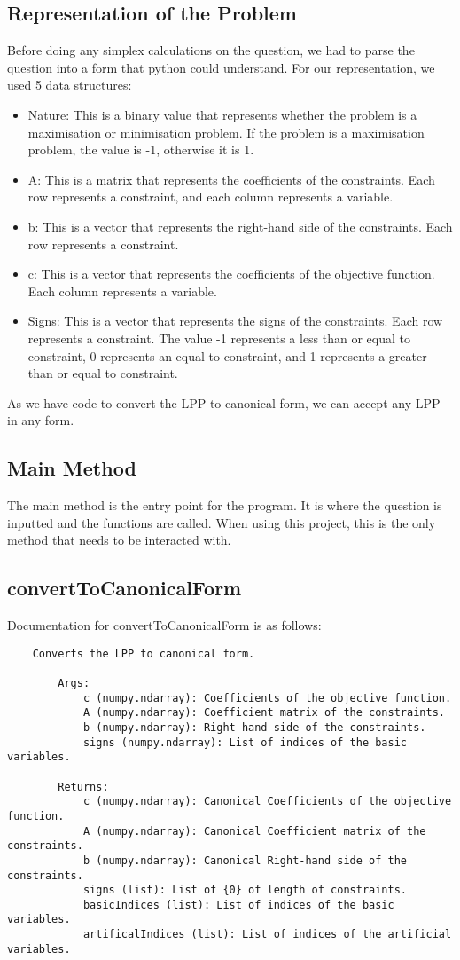 \documentclass{article}
\numberwithin{equation}{section}
\begin{document}
\subsection{Representation of the Problem}
Before doing any simplex calculations on the question, we had to parse the question into a form that python could understand. For our representation, we used 5 data structures:
\begin{itemize}
    \item Nature: This is a binary value that represents whether the problem is a maximisation or minimisation problem. If the problem is a maximisation problem, the value is -1, otherwise it is 1.
    \item A: This is a matrix that represents the coefficients of the constraints. Each row represents a constraint, and each column represents a variable.
    \item b: This is a vector that represents the right-hand side of the constraints. Each row represents a constraint.
    \item c: This is a vector that represents the coefficients of the objective function. Each column represents a variable.
    \item Signs: This is a vector that represents the signs of the constraints. Each row represents a constraint. The value -1 represents a less than or equal to constraint, 0 represents an equal to constraint, and 1 represents a greater than or equal to constraint.
\end{itemize}
As we have code to convert the LPP to canonical form, we can accept any LPP in any form.
\newpage
\subsection{Main Method}
The main method is the entry point for the program. It is where the question is inputted and the functions are called. When using this project, this is the only method that needs to be interacted with.
\subsection{convertToCanonicalForm}
Documentation for convertToCanonicalForm is as follows:
\begin{lstlisting}
    Converts the LPP to canonical form.

        Args:
            c (numpy.ndarray): Coefficients of the objective function.
            A (numpy.ndarray): Coefficient matrix of the constraints.
            b (numpy.ndarray): Right-hand side of the constraints.
            signs (numpy.ndarray): List of indices of the basic variables.

        Returns:
            c (numpy.ndarray): Canonical Coefficients of the objective function.
            A (numpy.ndarray): Canonical Coefficient matrix of the constraints.
            b (numpy.ndarray): Canonical Right-hand side of the constraints.
            signs (list): List of {0} of length of constraints.
            basicIndices (list): List of indices of the basic variables.
            artificalIndices (list): List of indices of the artificial variables.
\end{lstlisting}
\end{document}
